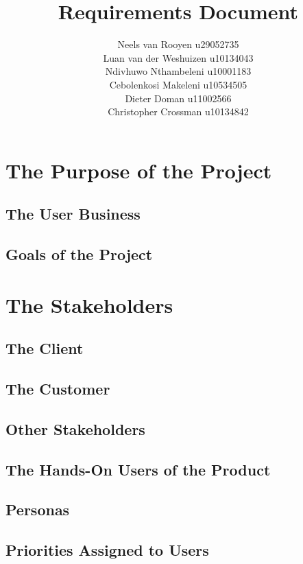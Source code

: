 \documentclass[12pt,a4paper]{article}
\begin{document}
\title{Requirements Document}
\author{Neels van Rooyen u29052735\\
Luan van der Weshuizen u10134043\\
Ndivhuwo Nthambeleni u10001183\\
Cebolenkosi Makeleni u10534505\\
Dieter Doman u11002566\\
Christopher Crossman u10134842}
\maketitle
\pagebreak
\section{The Purpose of the Project}
\subsection{The User Business}
\paragraph{}
\subsection{Goals of the Project}
\pagebreak
\section{The Stakeholders}
\subsection{The Client}
\subsection{The Customer}
\subsection{Other Stakeholders}
\subsection{The Hands-On Users of the Product}
\subsection{Personas}
\subsection{Priorities Assigned to Users}
\end{document}

